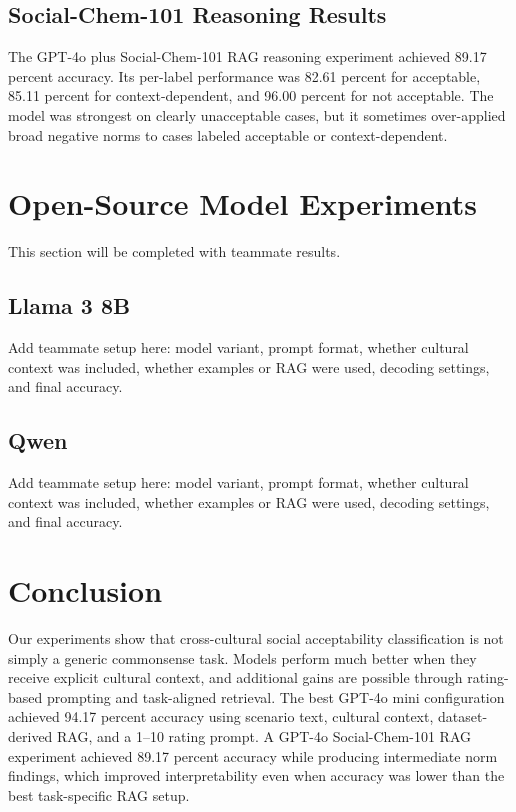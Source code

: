 \documentclass{article}
\begin{document}
\subsection{Social-Chem-101 Reasoning Results}

The GPT-4o plus Social-Chem-101 RAG reasoning experiment achieved 89.17 percent accuracy. Its per-label performance was 82.61 percent for acceptable, 85.11 percent for context-dependent, and 96.00 percent for not acceptable. The model was strongest on clearly unacceptable cases, but it sometimes over-applied broad negative norms to cases labeled acceptable or context-dependent.

\section{Open-Source Model Experiments}

This section will be completed with teammate results.

\subsection{Llama 3 8B}

Add teammate setup here: model variant, prompt format, whether cultural context was included, whether examples or RAG were used, decoding settings, and final accuracy.

\subsection{Qwen}

Add teammate setup here: model variant, prompt format, whether cultural context was included, whether examples or RAG were used, decoding settings, and final accuracy.

\section{Conclusion}

Our experiments show that cross-cultural social acceptability classification is not simply a generic commonsense task. Models perform much better when they receive explicit cultural context, and additional gains are possible through rating-based prompting and task-aligned retrieval. The best GPT-4o mini configuration achieved 94.17 percent accuracy using scenario text, cultural context, dataset-derived RAG, and a 1--10 rating prompt. A GPT-4o Social-Chem-101 RAG experiment achieved 89.17 percent accuracy while producing intermediate norm findings, which improved interpretability even when accuracy was lower than the best task-specific RAG setup.
\end{document}
